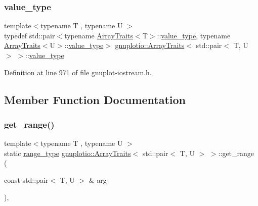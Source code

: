 \subsubsection{\texorpdfstring{value\+\_\+type}{value\_type}}
{\footnotesize\ttfamily template$<$typename T , typename U $>$ \\
typedef std\+::pair$<$typename \hyperlink{classgnuplotio_1_1_array_traits}{Array\+Traits}$<$T$>$\+::\hyperlink{classgnuplotio_1_1_array_traits_3_01std_1_1pair_3_01_t_00_01_u_01_4_01_4_a143ab4d4cf6693d33e46fa41d3265aab}{value\+\_\+type}, typename \hyperlink{classgnuplotio_1_1_array_traits}{Array\+Traits}$<$U$>$\+::\hyperlink{classgnuplotio_1_1_array_traits_3_01std_1_1pair_3_01_t_00_01_u_01_4_01_4_a143ab4d4cf6693d33e46fa41d3265aab}{value\+\_\+type}$>$ \hyperlink{classgnuplotio_1_1_array_traits}{gnuplotio\+::\+Array\+Traits}$<$ std\+::pair$<$ T, U $>$ $>$\+::\hyperlink{classgnuplotio_1_1_array_traits_3_01std_1_1pair_3_01_t_00_01_u_01_4_01_4_a143ab4d4cf6693d33e46fa41d3265aab}{value\+\_\+type}}



Definition at line 971 of file gnuplot-\/iostream.\+h.



\subsection{Member Function Documentation}
\mbox{\label{classgnuplotio_1_1_array_traits_3_01std_1_1pair_3_01_t_00_01_u_01_4_01_4_abc84b60061de787f3526163183e186f7}} 
\subsubsection{\texorpdfstring{get\+\_\+range()}{get\_range()}}
{\footnotesize\ttfamily template$<$typename T , typename U $>$ \\
static \hyperlink{classgnuplotio_1_1_array_traits_3_01std_1_1pair_3_01_t_00_01_u_01_4_01_4_a80b3c6c794a51c78f0c645e5e4c19afc}{range\+\_\+type} \hyperlink{classgnuplotio_1_1_array_traits}{gnuplotio\+::\+Array\+Traits}$<$ std\+::pair$<$ T, U $>$ $>$\+::get\+\_\+range (\begin{DoxyParamCaption}\item[{const std\+::pair$<$ T, U $>$ \&}]{arg }\end{DoxyParamCaption})\hspace{0.3cm}{\ttfamily [inline]}, {\ttfamily [static]}}



